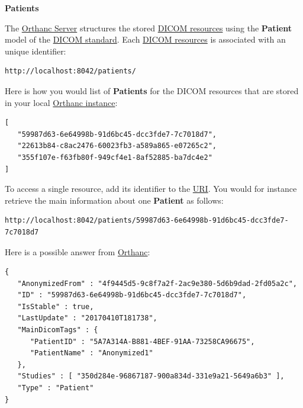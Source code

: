 \documentclass{tufte-book} %
\begin{document}
\clearpage


\textbf{Patients}

\hfill

The \href{https://www.orthanc-server.com/}{Orthanc Server} structures the stored \href{http://book.orthanc-server.com/users/rest.html#sending-dicom-images}{DICOM resources} using the \textbf{Patient} model of the \href{https://www.dicomstandard.org/current/}{DICOM standard}. Each \href{http://book.orthanc-server.com/users/rest.html#sending-dicom-images}{DICOM resources} is associated with an unique identifier:

\begin{lstlisting}
http://localhost:8042/patients/
\end{lstlisting}

\hfill

Here is how you would list of \textbf{Patients} for the DICOM resources that are stored in your local \href{http://book.orthanc-server.com/faq/rest-samples.html}{Orthanc instance}:

\begin{lstlisting}
[
   "59987d63-6e64998b-91d6bc45-dcc3fde7-7c7018d7",
   "22613b84-c8ac2476-60023fb3-a589a865-e07265c2",
   "355f107e-f63fb80f-949cf4e1-8af52885-ba7dc4e2"
]
\end{lstlisting}

\hfill

To access a single resource, add its identifier to the \href{https://en.wikipedia.org/wiki/Uniform_resource_identifier}{URI}. You would for instance retrieve the main information about one \textbf{Patient} as follows:

\begin{lstlisting}
http://localhost:8042/patients/59987d63-6e64998b-91d6bc45-dcc3fde7-7c7018d7
\end{lstlisting}

\hfill

Here is a possible answer from \href{https://www.orthanc-server.com/}{Orthanc}:

\begin{lstlisting}
{
   "AnonymizedFrom" : "4f9445d5-9c8f7a2f-2ac9e380-5d6b9dad-2fd05a2c",
   "ID" : "59987d63-6e64998b-91d6bc45-dcc3fde7-7c7018d7",
   "IsStable" : true,
   "LastUpdate" : "20170410T181738",
   "MainDicomTags" : {
      "PatientID" : "5A7A314A-B881-4BEF-91AA-73258CA96675",
      "PatientName" : "Anonymized1"
   },
   "Studies" : [ "350d284e-96867187-900a834d-331e9a21-5649a6b3" ],
   "Type" : "Patient"
}
\end{lstlisting}
\end{document}
